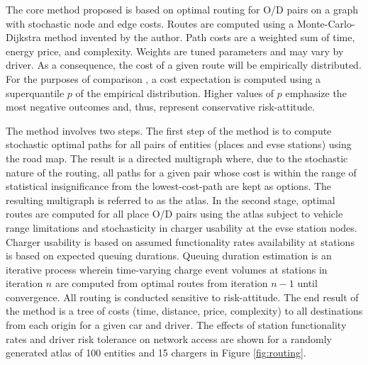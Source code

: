 \documentclass[12pt]{article}
\begin{document}
The core method proposed is based on optimal routing for O/D pairs on a graph with stochastic node and edge costs. Routes are computed using a Monte-Carlo-Dijkstra method invented by the author. Path costs are a weighted sum of time, energy price, and complexity. Weights are tuned parameters and may vary by driver. As a consequence, the cost of a given route will be empirically distributed. For the purposes of comparison , a cost expectation is computed using a superquantile $p$ of the empirical distribution. Higher values of $p$ emphasize the most negative outcomes and, thus, represent conservative risk-attitude.

The method involves two steps. The first step of the method is to compute stochastic optimal paths for all pairs of entities (places and \gls{evse} stations) using the road map. The result is a directed multigraph where, due to the stochastic nature of the routing, all paths for a given pair whose cost is within the range of statistical insignificance from the lowest-cost-path are kept as options. The resulting multigraph is referred to as the atlas. In the second stage, optimal routes are computed for all place O/D pairs using the atlas subject to vehicle range limitations and stochasticity in charger usability at the \gls{evse} station nodes. Charger usability is based on assumed functionality rates availability at stations is based on expected queuing durations. Queuing duration estimation is an iterative process wherein time-varying charge event volumes at stations in iteration $n$ are computed from optimal routes from iteration $n-1$ until convergence. All routing is conducted sensitive to risk-attitude. The end result of the method is a tree of costs (time, distance, price, complexity) to all destinations from each origin for a given car and driver. The effects of station functionality rates and driver risk tolerance on network access are shown for a randomly generated atlas of 100 entities and 15 chargers in Figure \ref{fig:routing}.
\end{document}
